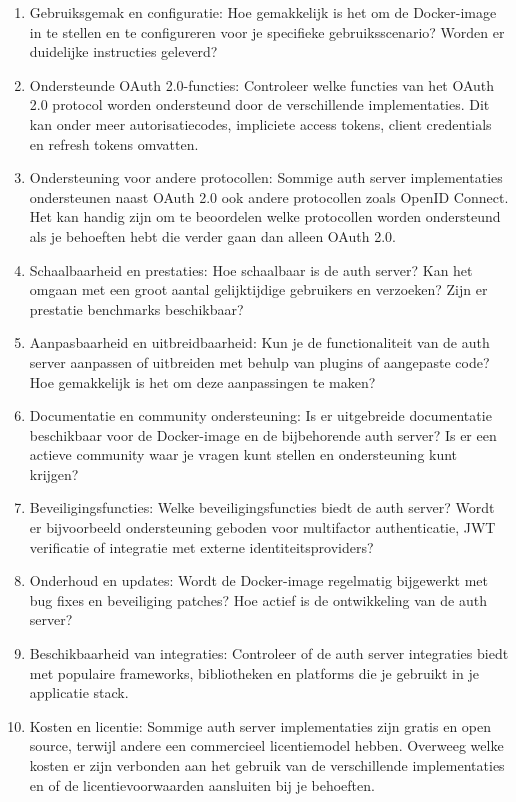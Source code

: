 \begin{enumerate}
  \item Gebruiksgemak en configuratie: Hoe gemakkelijk is het om de Docker-image in te stellen en te configureren voor je specifieke gebruiksscenario? Worden er duidelijke instructies geleverd?

  \item Ondersteunde OAuth 2.0-functies: Controleer welke functies van het OAuth 2.0 protocol worden ondersteund door de verschillende implementaties. Dit kan onder meer autorisatiecodes, impliciete access tokens, client credentials en refresh tokens omvatten.
  
  \item Ondersteuning voor andere protocollen: Sommige auth server implementaties ondersteunen naast OAuth 2.0 ook andere protocollen zoals OpenID Connect. Het kan handig zijn om te beoordelen welke protocollen worden ondersteund als je behoeften hebt die verder gaan dan alleen OAuth 2.0.
  
  \item Schaalbaarheid en prestaties: Hoe schaalbaar is de auth server? Kan het omgaan met een groot aantal gelijktijdige gebruikers en verzoeken? Zijn er prestatie benchmarks beschikbaar?
  
  \item Aanpasbaarheid en uitbreidbaarheid: Kun je de functionaliteit van de auth server aanpassen of uitbreiden met behulp van plugins of aangepaste code? Hoe gemakkelijk is het om deze aanpassingen te maken?
  
  \item Documentatie en community ondersteuning: Is er uitgebreide documentatie beschikbaar voor de Docker-image en de bijbehorende auth server? Is er een actieve community waar je vragen kunt stellen en ondersteuning kunt krijgen?
  
  \item Beveiligingsfuncties: Welke beveiligingsfuncties biedt de auth server? Wordt er bijvoorbeeld ondersteuning geboden voor multifactor authenticatie, JWT verificatie of integratie met externe identiteitsproviders?
  
  \item Onderhoud en updates: Wordt de Docker-image regelmatig bijgewerkt met bug fixes en beveiliging patches? Hoe actief is de ontwikkeling van de auth server?
  
  \item Beschikbaarheid van integraties: Controleer of de auth server integraties biedt met populaire frameworks, bibliotheken en platforms die je gebruikt in je applicatie stack.
  
  \item Kosten en licentie: Sommige auth server implementaties zijn gratis en open source, terwijl andere een commercieel licentiemodel hebben. Overweeg welke kosten er zijn verbonden aan het gebruik van de verschillende implementaties en of de licentievoorwaarden aansluiten bij je behoeften.
\end{enumerate}


